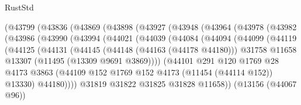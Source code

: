 \begin{lexlean}{RustStd}
\begin{coremodule}
                (@43799
                  (@43836
                    (@43869
                      (@43898
                        (@43927
                          (@43948
                            (@43964
                              (@43978
                                (@43982
                                  (@43986
                                    (@43990
                                      (@43994
                                        (@44021
                                          (@44039
                                            (@44084
                                              (@44094
                                                (@44099
                                                  (@44119
                                                    (@44125
                                                      (@44131
                                                        (@44145
                                                          (@44148 (@44163 (@44178 @44180)))
                                                          @31758
                                                          @11658
                                                          @13307
                                                          (@11495 (@13309 @9691 @3869))))
                                                      (@44101
                                                        @291
                                                        @120
                                                        @1769
                                                        @28
                                                        @4173
                                                        @3863
                                                        (@44109
                                                          @152
                                                          @1769
                                                          @152
                                                          @4173
                                                          (@11454 (@44114 @152))
                                                          @13330)
                                                        @44180))))
                                                @31819
                                                @31822
                                                @31825
                                                @31828
                                                @11658))
                                            (@13156 (@44067 @96))

\end{coremodule}
\end{lexlean}
